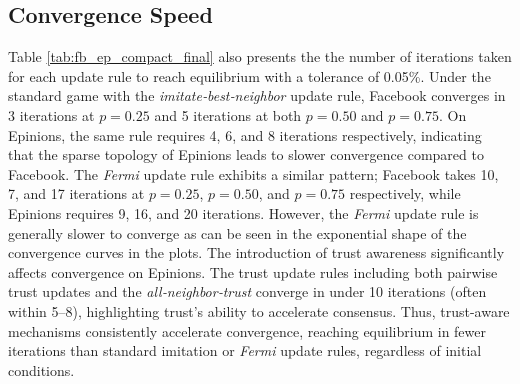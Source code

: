 \subsection{Convergence Speed}
Table \ref{tab:fb_ep_compact_final} also presents the the number of iterations taken for each update rule to reach equilibrium with a tolerance of 0.05\%.
Under the standard game with the \emph{imitate‐best‐neighbor} update rule, Facebook converges in 3 iterations at \(p=0.25\) and 5 iterations at both \(p=0.50\) and \(p=0.75\).
On Epinions, the same rule requires 4, 6, and 8 iterations respectively, indicating that the sparse topology of Epinions leads to slower convergence compared to Facebook.
The \emph{Fermi} update rule exhibits a similar pattern; Facebook takes 10, 7, and 17 iterations at \(p=0.25\), \(p=0.50\), and \(p=0.75\) respectively, 
while Epinions requires 9, 16, and 20 iterations. However, the \emph{Fermi} update rule is generally slower to converge as can be seen in the exponential shape of the convergence curves in the plots.
The introduction of trust awareness significantly affects convergence on Epinions. 
The trust update rules including both pairwise trust updates and the \emph{all‐neighbor‐trust} converge in under 10 iterations (often within 5–8), highlighting trust’s ability to accelerate consensus.
Thus, trust-aware mechanisms consistently accelerate convergence, reaching equilibrium in fewer iterations than standard imitation or \emph{Fermi} update rules, regardless of initial conditions.